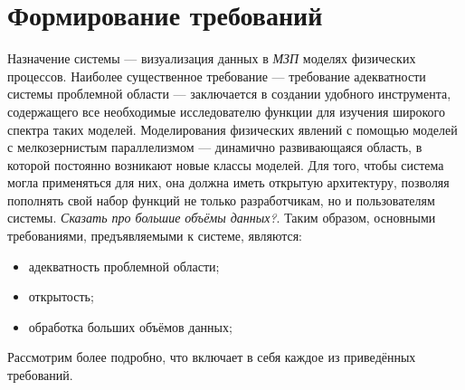 \documentclass[a4paper,12pt]{extarticle}
\let\stdsection\section
\renewcommand\section{
    \newpage
    \stdsection
}
\begin{document}
\section{Формирование требований}
\label{sec:requirements}

Назначение системы --- визуализация данных в \textit{МЗП} моделях физических процессов.  Наиболее существенное требование --- требование адекватности системы проблемной области --- заключается в создании удобного инструмента, содержащего все необходимые исследователю функции для изучения широкого спектра таких моделей.  Моделирования физических явлений с помощью моделей с мелкозернистым параллелизмом --- динамично развивающаяся область, в которой постоянно возникают новые классы моделей. Для того, чтобы система могла применяться для них, она должна иметь открытую архитектуру, позволяя пополнять свой набор функций не только разработчикам, но и пользователям системы. \textit{Сказать про большие объёмы данных?}. Таким образом, основными требованиями, предъявляемыми к системе, являются:
\begin{itemize}
    \item адекватность проблемной области;
    \item открытость;
    \item обработка больших объёмов данных;
\end{itemize}

Рассмотрим более подробно, что включает в себя каждое из приведённых требований.
\end{document}

